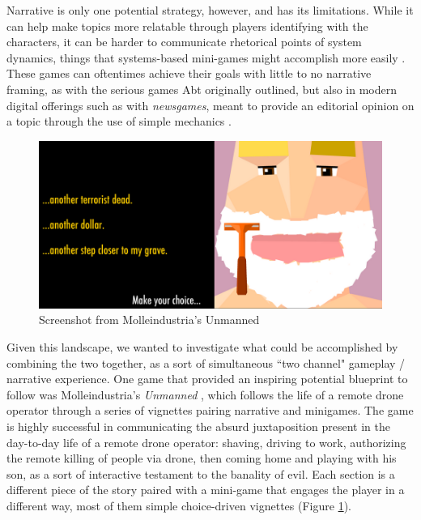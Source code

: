 Narrative is only one potential strategy, however, and has its limitations. While it can help make topics more relatable through players identifying with the characters, it can be harder to communicate rhetorical points of system dynamics, things that systems-based mini-games might accomplish more easily \cite{frasca2013simulation}. These games can oftentimes achieve their goals with little to no narrative framing, as with the serious games Abt originally outlined, but also in modern digital offerings such as with \textit{newsgames}, meant to provide an editorial opinion on a topic through the use of simple mechanics \cite{treanor2009newsgames}.

\begin{figure}
    \centering
    \includegraphics[width=\textwidth]{figures/3-StoryAssembler/unmanned.png}
    \caption{Screenshot from Molleindustria's Unmanned}
    \label{fig:unmanned}
\end{figure}

Given this landscape, we wanted to investigate what could be accomplished by combining the two together, as a sort of simultaneous ``two channel" gameplay / narrative experience. One game that provided an inspiring potential blueprint to follow was Molleindustria's \textit{Unmanned} \cite{pedercini_jim_munroe_2012}, which follows the life of a remote drone operator through a series of vignettes pairing narrative and minigames. The game is highly successful in communicating the absurd juxtaposition present in the day-to-day life of a remote drone operator: shaving, driving to work, authorizing the remote killing of people via drone, then coming home and playing with his son, as a sort of interactive testament to the banality of evil. Each section is a different piece of the story paired with a mini-game that engages the player in a different way, most of them simple choice-driven vignettes (Figure \ref{fig:unmanned}). 

